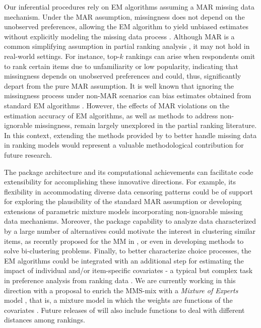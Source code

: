 Our inferential procedures rely on EM algorithms assuming a MAR missing data mechanism. Under the MAR assumption, missingness does not depend on the unobserved preferences, allowing the EM algorithm to yield unbiased estimates without explicitly modeling the missing data process \citep{rubin1976inference,little2019statistical}. Although MAR is a common simplifying assumption in partial ranking analysis \citep{beckett93maximum,Jacques2014,piancastelli2025time}, it may not hold in real-world settings. For instance, top-$k$ rankings can arise when respondents omit to rank certain items due to unfamiliarity or low popularity, indicating that missingness depends on unobserved preferences and could, thus, significantly depart from the pure MAR assumption. It is well known that ignoring the missingness process under non-MAR scenarios can bias estimates obtained from standard EM algorithms \citep{little2019statistical}. However, the effects of MAR violations on the estimation accuracy of EM algorithms, as well as methods to address non-ignorable missingness, remain largely unexplored in the partial ranking literature. In this context, extending the methods provided by  to better handle missing data in ranking models would represent a valuable methodological contribution for future research.

The package architecture and its computational achievements can facilitate code extensibility for accomplishing these innovative directions. For example, its flexibility in accommodating diverse data censoring patterns could be of support for exploring the plausibility of the standard MAR assumption or developing extensions of parametric mixture models incorporating non-ignorable missing data mechanisms. Moreover, the package capability to analyze data characterized by a large number of alternatives could motivate the interest in clustering similar items, as recently proposed for the MM in \citet{piancastelli}, or even in developing methods to solve bi-clustering problems.  Finally, to better characterize choice processes, the EM algorithms could be integrated with an additional step for estimating the impact of individual and/or item-specific covariates - a typical but complex task in preference analysis from ranking data \citep[see e.g.,][]{ gormley2008mixture,zhu21partition}. 
We are currently working in this direction with a proposal to enrich the MMS-mix with a \textit{Mixture of Experts} model \citep{jacobs,jordan}, that is, a mixture model in which the weights are functions of the covariates \citep{crispinoMoE}. Future releases of  will also include functions to deal with different distances among rankings. 

